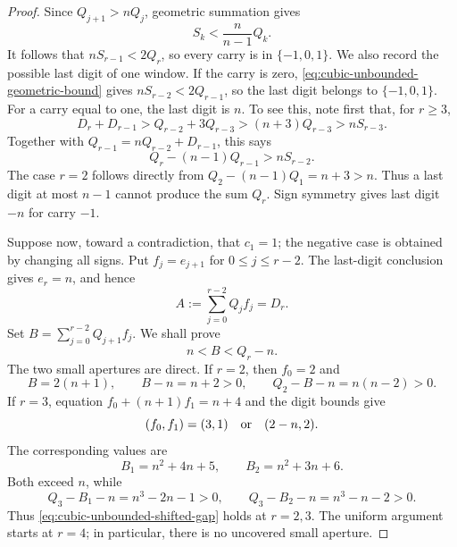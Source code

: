 \begin{proof}
Since $Q_{j+1}>nQ_j$, geometric summation gives
\begin{equation}
S_k<\frac{n}{n-1}Q_k.
\label{eq:cubic-unbounded-geometric-bound}
\end{equation}
It follows that $nS_{r-1}<2Q_r$, so every carry is in
$\{-1,0,1\}$.  We also record the possible last digit of one window.  If
the carry is zero, \eqref{eq:cubic-unbounded-geometric-bound} gives
$nS_{r-2}<2Q_{r-1}$, so the last digit belongs to $\{-1,0,1\}$.
For a carry equal to one, the last digit is $n$.  To see this, note first
that, for $r\ge3$,
\[
D_r+D_{r-1}>Q_{r-2}+3Q_{r-3}>(n+3)Q_{r-3}
>nS_{r-3}.
\]
Together with $Q_{r-1}=nQ_{r-2}+D_{r-1}$, this says
\begin{equation}
Q_r-(n-1)Q_{r-1}>nS_{r-2}.
\label{eq:cubic-unbounded-last-digit-gap}
\end{equation}
The case $r=2$ follows directly from
$Q_2-(n-1)Q_1=n+3>n$.  Thus a last digit at most $n-1$ cannot produce
the sum $Q_r$.  Sign symmetry gives last digit $-n$ for carry $-1$.

Suppose now, toward a contradiction, that $c_1=1$; the negative case is
obtained by changing all signs.  Put $f_j=e_{j+1}$ for
$0\le j\le r-2$.  The last-digit conclusion gives $e_r=n$, and hence
\begin{equation}
A:=\sum_{j=0}^{r-2}Q_jf_j=D_r.
\label{eq:cubic-unbounded-prefix-D}
\end{equation}
Set $B=\sum_{j=0}^{r-2}Q_{j+1}f_j$.  We shall prove
\begin{equation}
n<B<Q_r-n.
\label{eq:cubic-unbounded-shifted-gap}
\end{equation}
The two small apertures are direct.  If $r=2$, then $f_0=2$ and
\[
B=2(n+1),\qquad B-n=n+2>0,\qquad
Q_2-B-n=n(n-2)>0.
\]
If $r=3$, equation
$f_0+(n+1)f_1=n+4$ and the digit bounds give
\[
(f_0,f_1)=(3,1)\quad\hbox{or}\quad(2-n,2).
\]
The corresponding values are
\[
B_1=n^2+4n+5,
\qquad
B_2=n^2+3n+6.
\]
Both exceed $n$, while
\[
Q_3-B_1-n=n^3-2n-1>0,
\qquad
Q_3-B_2-n=n^3-n-2>0.
\]
Thus \eqref{eq:cubic-unbounded-shifted-gap} holds at $r=2,3$.
The uniform argument starts at $r=4$; in particular, there is no
uncovered small aperture.


\end{proof}
